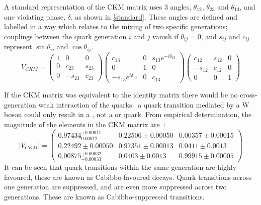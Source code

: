 A standard representation of the CKM matrix uses 3 angles, $\theta_{12}$, $\theta_{23}$ and $\theta_{13}$, and one \CP violating phase, $\delta$, as shown in \eqn\ref{standard}. These angles are defined and labelled in a way which relates to the mixing of two specific generations; couplings between the quark generation $i$ and $j$ vanish if $\theta_{ij} = 0$, and $s_{ij}$ and $c_{ij}$ represent $\sin\theta_{ij}$ and $\cos\theta_{ij}$.
\begin{equation}
V_{CKM} = \begin{pmatrix} 1 & 0 & 0 \\ 
0 & c_{23} & s_{23} \\ 
0 & -s_{23} & c_{23} \end{pmatrix}
\begin{pmatrix} c_{13} & 0 & s_{13}e^{-i\delta_{13}} \\ 
0 & 1 & 0 \\ 
-s_{13}e^{i\delta_{13}} & 0 & c_{13} \end{pmatrix}
\begin{pmatrix} c_{12} & s_{12} & 0 \\ 
-s_{12} & c_{12} & 0 \\ 
0 & 0 & 1 \end{pmatrix}
\label{standard}
\end{equation}

If the CKM matrix was equivalent to the identity matrix there would be no cross-generation weak interaction of the quarks \eg\ a \uquark quark transition mediated by a W boson could only result in a \dquark, not a \squark or \bquark quark. From empirical determination, the magnitude of the elements in the CKM matrix are~\cite{PDG2016}:
\begin{equation}
| V_{CKM} | = \begin{pmatrix} 0.97434^{+0.00011}_{0.00012} & 0.22506 \pm 0.00050 & 0.00357 \pm 0.00015 \\ 0.22492 \pm 0.00050 & 0.97351 \pm 0.00013 & 0.0411 \pm 0.0013 \\ 0.00875^{+0.00032}_{-0.00033} & 0.0403 \pm 0.0013 & 0.99915 \pm 0.00005 \end{pmatrix}
\end{equation}
It can be seen that quark transitions within the same generation are highly favoured, these are known as Cabibbo-favoured decays. Quark transitions across one generation are suppressed, and are even more suppressed across two generations. These are known as Cabibbo-suppressed transitions. 

